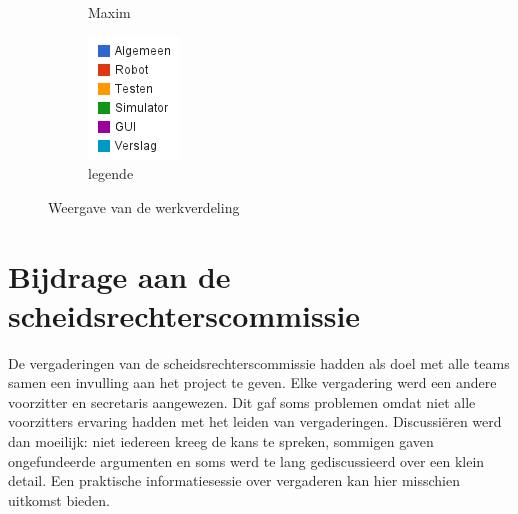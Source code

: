 \documentclass[eind]{penoverslag}
\begin{document}
\begin{figure}[h]
\begin{subfigure}[hb]{0.15\textwidth}
                \caption{Maxim}
        \end{subfigure}%
        \begin{subfigure}[hb]{0.11\textwidth}
                \centering
                \includegraphics[width=\textwidth]{werk_legende}
                \caption{legende}
        \end{subfigure}
 \caption{Weergave van de werkverdeling}
\label{fig:werkverdeling}
\end{figure}

\section{Bijdrage aan de scheidsrechterscommissie}
\label{Asec:scheids}
De vergaderingen van de scheidsrechterscommissie hadden als doel met alle teams samen een invulling aan het project te geven. Elke vergadering werd een andere voorzitter en secretaris aangewezen. Dit gaf soms problemen omdat niet alle voorzitters ervaring hadden met het leiden van vergaderingen. Discussi\"eren werd dan moeilijk: niet iedereen kreeg de kans te spreken, sommigen gaven ongefundeerde argumenten en soms werd te lang gediscussieerd over een klein detail. Een praktische informatiesessie over vergaderen kan hier misschien uitkomst bieden.
\end{document}
